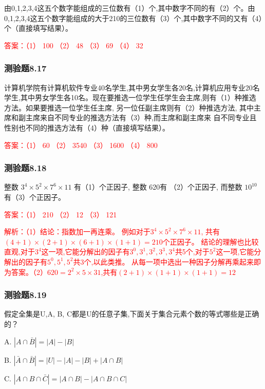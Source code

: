 \documentclass[UTF8, heading=true]{ctexart}
\begin{document}
由0,1,2,3,4这五个数字能组成的三位数有（1）个,其中数字不同的有（2）个。由0,1,2,3,4这五个数字能组成的大于210的三位数有（3）个,其中数字不同的又有（4）个（直接填写结果）。

\textcolor{red}{答案：（1） 100 （2） 48 （3） 69 （4） 32}

\subsubsection{测验题8.17}

计算机学院有计算机软件专业40名学生,其中男女学生各20名,计算机应用专业20名学生,其中男女学生各10名。现在要推选一位学生任学生会主席,则有（1）种推选方法。如果要推选一位学生任主席,
另一位任副主席则有（2）种推选方法,
其中主席和副主席来自不同专业的推选方法有（3）种,而主席和副主席来
自不同专业且性别也不同的推选方法有（4）种（直接填写结果）。

\textcolor{red}{答案：（1） 60 （2） 3540 （3） 1600 （4） 800}

\subsubsection{测验题8.18}

整数 $3^4 \times 5^2 \times 7^6 \times 11$ 有（1）个正因子, 整数 620有 （2）个正因子,
而整数 $10^{10}$ 有（3）个正因子。

\textcolor{red}{答案：（1） 210 （2） 12 （3） 121}

\textcolor{red}{解析：\newline（1）结论：指数加一再连乘。 例如对于$3^4 \times 5^2 \times 7^6 \times 11$,
共有$(4+1) \times (2+1) \times (6+1) \times (1+1)=210$个正因子。
结论的理解也比较直观,对于$3^4$这一项,它能分解出的因子有$3^0,3^1,3^2,3^3,3^4$共5个,对于$5^2$这一项,它能分解出的因子有$5^0,5^1,5^2$共3个,以此类推。
从每一项中选出一种因子分解再乘起来即为答案。\newline （2）$620=2^2 \times 5 \times 31$,共有$(2+1) \times (1+1) \times (1+1)=12$}


\subsubsection{测验题8.19}

假定全集是U,A, B, C都是U的任意子集,下面关于集合元素个数的等式哪些是正确的？

A. $|A \cap \bar{B}|=|A|-|B|$

B. $|\bar{A} \cap \bar{B}|=|U|-|A|-|B|+|A \cap B|$

C. $|A \cap B \cap \bar{C}|=|A \cap B|-|A \cap B \cap C|$
\end{document}
